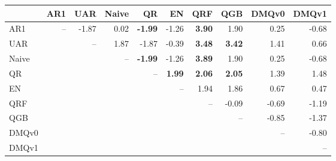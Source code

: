 \begin{tabular}{lrrrrrrrrr}
\toprule
 & AR1 & UAR & Naive & QR & EN & QRF & QGB & DMQv0 & DMQv1 \\
\midrule
AR1 & -- & -1.87 & 0.02 & \textbf{-1.99} & -1.26 & \textbf{3.90} & 1.90 & 0.25 & -0.68 \\
UAR &  & -- & 1.87 & -1.87 & -0.39 & \textbf{3.48} & \textbf{3.42} & 1.41 & 0.66 \\
Naive &  &  & -- & \textbf{-1.99} & -1.26 & \textbf{3.89} & 1.90 & 0.25 & -0.68 \\
QR &  &  &  & -- & \textbf{1.99} & \textbf{2.06} & \textbf{2.05} & 1.39 & 1.48 \\
EN &  &  &  &  & -- & 1.94 & 1.86 & 0.67 & 0.47 \\
QRF &  &  &  &  &  & -- & -0.09 & -0.69 & -1.19 \\
QGB &  &  &  &  &  &  & -- & -0.85 & -1.37 \\
DMQv0 &  &  &  &  &  &  &  & -- & -0.80 \\
DMQv1 &  &  &  &  &  &  &  &  & -- \\
\bottomrule
\end{tabular}
